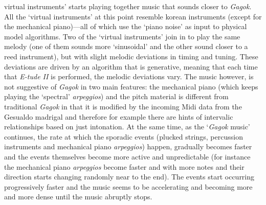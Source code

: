 virtual instruments' starts playing together music that sounds closer to \emph{Gagok}. All the `virtual instruments' at this point resemble korean instruments (except for the mechanical piano)---all of which use the `piano noise' as input to physical model algorithms. Two of the `virtual instruments' join in to play the same melody (one of them sounds more `sinusoidal' and the other sound closer to a reed instrument), but with slight melodic deviations in timing and tuning. These deviations are driven by an algorithm that is generative, meaning that each time that \emph{E-tude II} is performed, the melodic deviations vary. The music however, is not suggestive of \emph{Gagok} in two main features: the mechanical piano (which keeps playing the `spectral' \emph{arpeggios}) and the pitch material is different from traditional \emph{Gagok} in that it is modified by the incoming Midi data from the Gesualdo madrigal and therefore for example there are hints of intervalic relationships based on just intonation. At the same time, as the `\emph{Gagok} music' continues, the rate at which the sporadic events (plucked strings, percussion instruments and mechanical piano \emph{arpeggios}) happen, gradually becomes faster and the events themselves become more active and unpredictable (for instance the mechanical piano \emph{arpeggios} become faster and with more notes and their direction starts changing randomly near to the end). The events start occurring progressively faster and the music seems to be accelerating and becoming more and more dense until the music abruptly stops.

